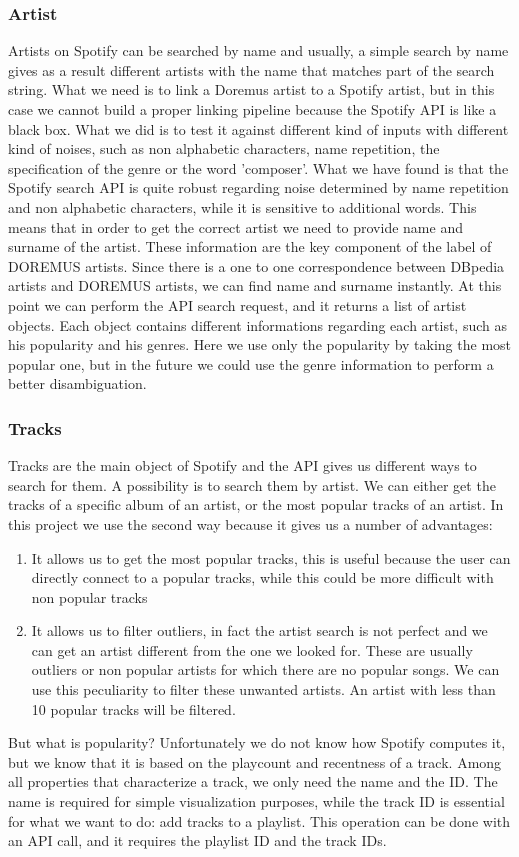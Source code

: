 \documentclass[paper=a4, fontsize=11pt]{scrartcl}
\begin{document}
\subsubsection{Artist}
Artists on Spotify can be searched by name and usually, a simple search by name gives as a result different artists with the name that matches part of the search string.
What we need is to link a Doremus artist to a Spotify artist, but in this case we cannot build a proper linking pipeline because the Spotify API is like a black box. What we did is to test it against different kind of inputs with different kind of noises, such as non alphabetic characters, name repetition, the specification of the genre or the word 'composer'. What we have found is that the Spotify search API is quite robust regarding noise determined by name repetition and non alphabetic characters, while it is sensitive to additional words. This means that in order to get the correct artist we need to provide name and surname of the artist. These information are the key component of the label of DOREMUS artists. Since there is a one to one correspondence between DBpedia artists and DOREMUS artists, we can find name and surname instantly. At this point we can perform the API search request, and it returns a list of artist objects. Each object contains different informations regarding each artist, such as his popularity and his genres. Here we use only the popularity by taking the most popular one, but in the future we could use the genre information to perform a better disambiguation.

\subsubsection{Tracks}
Tracks are the main object of Spotify and the API gives us different ways to search for them. A possibility is to search them by artist. We can either get the tracks of a specific album of an artist, or the most popular tracks of an artist. In this project we use the second way because it gives us a number of advantages:
\begin{enumerate}
\item It allows us to get the most popular tracks, this is useful because the user can directly connect to a popular tracks, while this could be more difficult with non popular tracks
\item It allows us to filter outliers, in fact the artist search is not perfect and we can get an artist different from the one we looked for. These are usually outliers or non popular artists for which there are no popular songs. We can use this peculiarity to filter these unwanted artists. An artist with less than 10 popular tracks will be filtered.
\end{enumerate}
But what is popularity? Unfortunately we do not know how Spotify computes it, but we know that it is based on the playcount and recentness of a track.
Among all properties that characterize a track, we only need the name and the ID.
The name is required for simple visualization purposes, while the track ID is essential for what we want to do: add tracks to a playlist. This operation can be done with an API call, and it requires the playlist ID and the track IDs.
\end{document}
